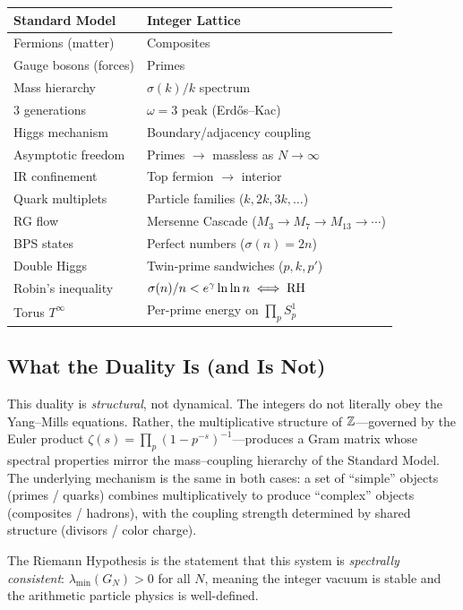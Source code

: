 \documentclass[11pt,a4paper]{article}
\begin{document}
\begin{center}
\begin{tabular}{@{}ll@{}}
\toprule
\textbf{Standard Model} & \textbf{Integer Lattice} \\
\midrule
Fermions (matter) & Composites \\
Gauge bosons (forces) & Primes \\
Mass hierarchy & $\sigma(k)/k$ spectrum \\
3 generations & $\omega = 3$ peak (Erd\H{o}s--Kac) \\
Higgs mechanism & Boundary/adjacency coupling \\
Asymptotic freedom & Primes $\to$ massless as $N \to \infty$ \\
IR confinement & Top fermion $\to$ interior \\
Quark multiplets & Particle families ($k, 2k, 3k, \ldots$) \\
RG flow & Mersenne Cascade ($M_3 \to M_7 \to M_{13} \to \cdots$) \\
BPS states & Perfect numbers ($\sigma(n) = 2n$) \\
Double Higgs & Twin-prime sandwiches ($p, k, p'$) \\
Robin's inequality & $\sigma(n)/n < e^\gamma \ln\ln n \iff \mathrm{RH}$ \\
Torus $T^\infty$ & Per-prime energy on $\prod_p S^1_p$ \\
\bottomrule
\end{tabular}
\end{center}

\subsection{What the Duality Is (and Is Not)}

This duality is \emph{structural}, not dynamical. The integers do not
literally obey the Yang--Mills equations. Rather, the multiplicative
structure of $\mathbb{Z}$---governed by the Euler product
$\zeta(s) = \prod_p (1 - p^{-s})^{-1}$---produces a Gram matrix whose
spectral properties mirror the mass--coupling hierarchy of the Standard
Model. The underlying mechanism is the same in both cases: a set of
``simple'' objects (primes / quarks) combines multiplicatively to produce
``complex'' objects (composites / hadrons), with the coupling strength
determined by shared structure (divisors / color charge).

The Riemann Hypothesis is the statement that this system is
\emph{spectrally consistent}: $\lambda_{\min}(G_N) > 0$ for all $N$,
meaning the integer vacuum is stable and the arithmetic particle physics
is well-defined.
\end{document}
